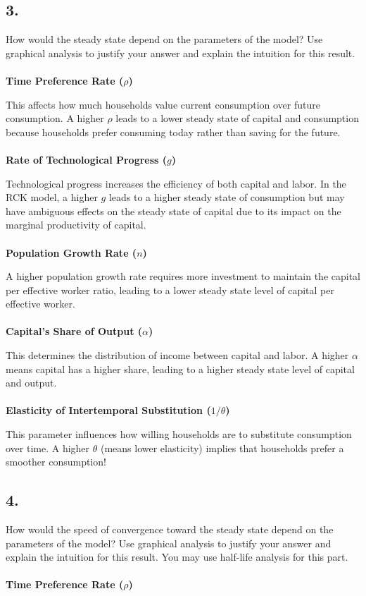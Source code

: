 \documentclass[12pt]{extarticle}
\def\secondarycolor{Golden}
\newcommand{\problem}[1]{
    \subsection*{\textcolor{\secondarycolor}{#1}}
    \addcontentsline{toc}{subsection}{\protect\numberline{}#1}
}
\begin{document}
\newpage
\problem{3.} How would the steady state depend on the parameters of the model? Use graphical analysis to justify
your answer and explain the intuition for this result.\\\\
\textbf{Time Preference Rate (\( \rho \))}

This affects how much households value current consumption over future consumption.
A higher \( \rho \) leads to a lower steady state of capital and consumption because households prefer consuming today rather than saving for the future.\\\\
\textbf{Rate of Technological Progress (\( g \))}

Technological progress increases the efficiency of both capital and labor.
In the RCK model, a higher \( g \) leads to a higher steady state of consumption but may have ambiguous effects on the steady state of capital due to its impact on the marginal productivity of capital.\\\\
\textbf{Population Growth Rate (\( n \))}

A higher population growth rate requires more investment to maintain the capital per effective worker ratio,
leading to a lower steady state level of capital per effective worker.\\\\
\textbf{Capital's Share of Output (\( \alpha \))}

This determines the distribution of income between capital and labor.
A higher \( \alpha \) means capital has a higher share, leading to a higher steady state level of capital and output.\\\\
\textbf{Elasticity of Intertemporal Substitution (\( 1/\theta \))}

This parameter influences how willing households are to substitute consumption over time.
A higher $\theta$ (means lower elasticity) implies that households prefer a smoother consumption! 
\newpage
\problem{4.} How would the speed of convergence toward the steady state depend on the parameters of the model?
Use graphical analysis to justify your answer and explain the intuition for this result. You may use
half-life analysis for this part.\\\\
\textbf{Time Preference Rate (\( \rho \))}
\end{document}
